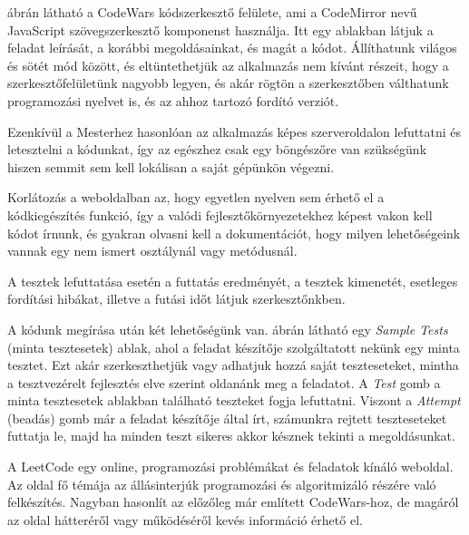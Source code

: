  ábrán látható a CodeWars kódszerkesztő felülete, ami a CodeMirror nevű JavaScript szövegszerkesztő komponenst használja. Itt egy ablakban látjuk a feladat leírását, a korábbi megoldásainkat, és magát a kódot. Állíthatunk világos és sötét mód között, és eltüntethetjük az alkalmazás nem kívánt részeit, hogy a szerkesztőfelületünk nagyobb legyen, és akár rögtön a szerkesztőben válthatunk programozási nyelvet is, és az ahhoz tartozó fordító verziót.

Ezenkívül a Mesterhez hasonlóan az alkalmazás képes szerveroldalon lefuttatni és letesztelni a kódunkat, így az egészhez csak egy böngészőre van szükségünk hiszen semmit sem kell lokálisan a saját gépünkön végezni.

Korlátozás a weboldalban az, hogy egyetlen nyelven sem érhető el a kódkiegészítés funkció, így a valódi fejlesztőkörnyezetekhez képest vakon kell kódot írnunk, és gyakran olvasni kell a dokumentációt, hogy milyen lehetőségeink vannak egy nem ismert osztálynál vagy metódusnál.

A tesztek lefuttatása esetén a futtatás eredményét, a tesztek kimenetét, esetleges fordítási hibákat, illetve a futási időt látjuk szerkesztőnkben.

A kódunk megírása után két lehetőségünk van.  ábrán látható egy \textsl{Sample Tests} (minta tesztesetek) ablak, ahol a feladat készítője szolgáltatott nekünk egy minta tesztet. Ezt akár szerkeszthetjük vagy adhatjuk hozzá saját teszteseteket, mintha a tesztvezérelt fejlesztés elve szerint oldanánk meg a feladatot. A \textsl{Test} gomb a minta tesztesetek ablakban található teszteket fogja lefuttatni. Viszont a \textsl{Attempt} (beadás) gomb már a feladat készítője által írt, számunkra rejtett teszteseteket futtatja le, majd ha minden teszt sikeres akkor késznek tekinti a megoldásunkat.


A LeetCode egy online, programozási problémákat és feladatok kínáló weboldal. Az oldal fő témája az állásinterjúk programozási és algoritmizáló részére való felkészítés. \cite{leetcode} Nagyban hasonlít az előzőleg már említett CodeWars-hoz, de magáról az oldal hátteréről vagy működéséről kevés információ érhető el.


